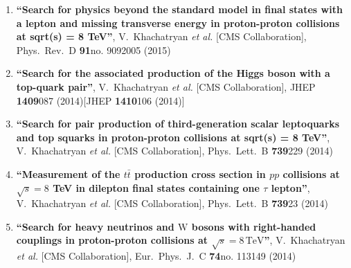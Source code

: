 \begin{enumerate}
\item%
{\bf ``Search for physics beyond the standard model in final states with a lepton and missing transverse energy in proton-proton collisions at sqrt(s) = 8 TeV''}, 
  V.~Khachatryan {\it et al.}  [CMS Collaboration], 
Phys.\ Rev.\ D {\bf 91}no. 9092005 (2015) %


\item%
{\bf ``Search for the associated production of the Higgs boson with a top-quark pair''}, 
  V.~Khachatryan {\it et al.}  [CMS Collaboration], 
JHEP {\bf 1409}087 (2014)[JHEP {\bf 1410}106 (2014)] %


\item%
{\bf ``Search for pair production of third-generation scalar leptoquarks and top squarks in proton-proton collisions at sqrt(s) = 8 TeV''}, 
  V.~Khachatryan {\it et al.}  [CMS Collaboration], 
Phys.\ Lett.\ B {\bf 739}229 (2014) %


\item%
{\bf ``Measurement of the $t \bar t$ production cross section in $pp$ collisions at $\sqrt s = 8$ TeV in dilepton final states containing one $\tau$ lepton''}, 
  V.~Khachatryan {\it et al.}  [CMS Collaboration], 
Phys.\ Lett.\ B {\bf 739}23 (2014) %


\item%
{\bf ``Search for heavy neutrinos and $\mathrm {W}$ bosons with right-handed couplings in proton-proton collisions at $\sqrt{s} = 8\,\text {TeV} $''}, 
  V.~Khachatryan {\it et al.}  [CMS Collaboration], 
Eur.\ Phys.\ J.\ C {\bf 74}no. 113149 (2014) %



\end{enumerate}
